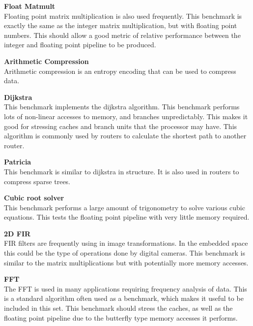 \documentclass[twocolumn]{article}
\begin{document}
\vspace{3mm}
\textbf{Float Matmult}\\
Floating point matrix multiplication is also used frequently. This benchmark is exactly the same as the integer matrix multiplication, but with floating point numbers. This should allow a good metric of relative performance between the integer and floating point pipeline to be produced.

\vspace{3mm}
\textbf{Arithmetic Compression}\\
Arithmetic compression is an entropy encoding that can be used to compress data.

\vspace{3mm}
\textbf{Dijkstra}\\
This benchmark implements the dijkstra algorithm. This benchmark performs lots of non-linear accesses to memory, and branches unpredictably. This makes it good for stressing caches and branch units that the processor may have. This algorithm is commonly used by routers to calculate the shortest path to another router.

\vspace{3mm}
\textbf{Patricia}\\
This benchmark is similar to dijkstra in structure. It is also used in routers to compress sparse trees.

\vspace{3mm}
\textbf{Cubic root solver}\\
This benchmark performs a large amount of trigonometry to solve various cubic equations. This tests the floating point pipeline with very little memory required.

\vspace{3mm}
\textbf{2D FIR}\\
FIR filters are frequently using in image transformations. In the embedded space this could be the type of operations done by digital cameras. This benchmark is similar to the matrix multiplications but with potentially more memory accesses.

\vspace{3mm}
\textbf{FFT}\\
The FFT is used in many applications requiring frequency analysis of data. This is a standard algorithm often used as a benchmark, which makes it useful to be included in this set. This benchmark should stress the caches, as well as the floating point pipeline due to the butterfly type memory accesses it performs.
\end{document}
